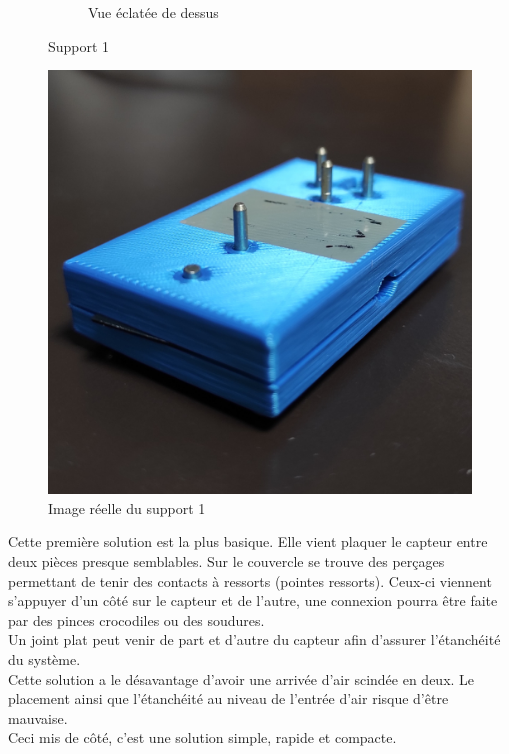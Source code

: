 \begin{figure}[H]
\begin{subfigure}{0.45\textwidth}
        \caption{Vue éclatée de dessus}
    \end{subfigure}
    \caption{Support 1}
    \label{fig:solution1}
\end{figure}

\begin{figure}[H]
    \centering
    \includegraphics[scale = 0.05, angle = 0]{assets/figures/Blue_real.jpg}
    \caption{Image réelle du support 1}
\end{figure}

Cette première solution est la plus basique. Elle vient plaquer le capteur entre deux pièces presque semblables. Sur le couvercle se trouve des
perçages permettant de tenir des contacts à ressorts (pointes ressorts). Ceux-ci viennent s'appuyer d'un côté sur le capteur et
de l'autre, une  connexion pourra être faite par des pinces crocodiles ou des soudures. \\
Un joint plat peut venir de part et d'autre du capteur afin d'assurer l'étanchéité du système.\\
Cette solution a le désavantage d'avoir une arrivée d'air scindée en deux. Le placement ainsi que l'étanchéité au niveau de l'entrée
d'air risque d'être mauvaise. \\
Ceci mis de côté, c'est une solution simple, rapide et compacte.

\newpage
